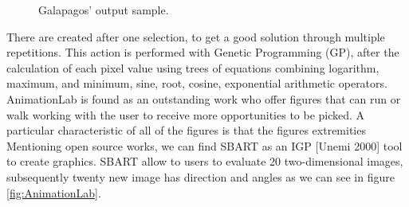 \begin{figure}
\captionsetup{justification=centering,margin=2cm}
\centering
\setlength\fboxsep{0pt}
\setlength\fboxrule{0.7pt}
\caption{Galapagos' output sample.}
\label{fig:Galapagos2}       
\end{figure}

There are created after one selection, to get a good solution through multiple
repetitions. This action is performed with Genetic Programming (GP), after the
calculation of each pixel value using trees of equations combining logarithm,
maximum, and minimum, sine, root, cosine, exponential arithmetic operators.
AnimationLab is found as an outstanding work who offer figures that can run or
walk working with the user to receive more opportunities to be picked. A
particular characteristic of all of the figures is that the figures extremities
Mentioning open source works, we can find SBART as an IGP
\cite{unemi2000sbart}[Unemi 2000] tool to create graphics. SBART allow to users
to evaluate 20 two-dimensional images, subsequently twenty new image has
direction and angles as we can see in figure \ref{fig:AnimationLab}.

